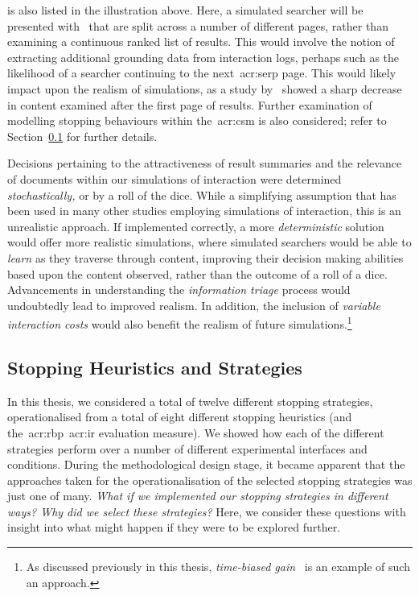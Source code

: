  is also listed in the illustration above. Here, a simulated searcher will be presented with~ that are split across a number of different pages, rather than examining a continuous ranked list of results. This would involve the notion of extracting additional grounding data from interaction logs, perhaps such as the likelihood of a searcher continuing to the next~\gls{acr:serp} page. This would likely impact upon the realism of simulations, as a study by~\cite{jansen2005analysis} showed a sharp decrease in content examined after the first page of results. Further examination of modelling stopping behaviours within the~\gls{acr:csm} is also considered; refer to Section~\ref{sec:conclusions:future:stopping} for further details.

 Decisions pertaining to the attractiveness of result summaries and the relevance of documents within our simulations of interaction were determined \emph{stochastically,} or by a roll of the dice. While a simplifying assumption that has been used in many other studies employing simulations of interaction, this is an unrealistic approach. If implemented correctly, a more \emph{deterministic} solution would offer more realistic simulations, where simulated searchers would be able to \emph{learn} as they traverse through content, improving their decision making abilities based upon the content observed, rather than the outcome of a roll of a dice. Advancements in understanding the \emph{information triage} process would undoubtedly lead to improved realism. In addition, the inclusion of \emph{variable interaction costs} would also benefit the realism of future simulations.\footnote{As discussed previously in this thesis, \emph{time-biased gain}~\citep{smucker2012tbg} is an example of such an approach.}

\subsection{Stopping Heuristics and Strategies}\label{sec:conclusions:future:stopping}
In this thesis, we considered a total of twelve different stopping strategies, operationalised from a total of eight different stopping heuristics (and the~\gls{acr:rbp}~\gls{acr:ir} evaluation measure). We showed how each of the different strategies perform over a number of different experimental interfaces and conditions. During the methodological design stage, it became apparent that the approaches taken for the operationalisation of the selected stopping strategies was just one of many. \emph{What if we implemented our stopping strategies in different ways? Why did we select these strategies?} Here, we consider these questions with insight into what might happen if they were to be explored further.

